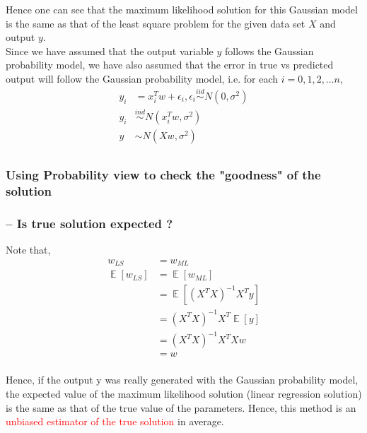 \documentclass{article}
\DeclareMathOperator*{\E}{\mathop{\mathbb{E}}}
\newcommand{\red}[1]{\textcolor{red}{#1}}
\begin{document}
Hence one can see that the maximum likelihood solution for this Gaussian model is the same as that of the least square problem for the given data set $X$ and output $y$.\\
Since we have assumed that the output variable $y$ follows the Gaussian probability model, we have also assumed that the error in true vs predicted output will follow the Gaussian probability model, i.e. for each $i = 0,1,2,\dots n$,
\begin{align*}
    y_i &= x_i^Tw+\epsilon_i, \epsilon_i \stackrel{iid}{\sim} N(0,\sigma^2)\\
    y_i &\stackrel{ind}{\sim} N(x_i^Tw,\sigma^2)\\
    y &\sim N(Xw,\sigma^2)\\
\end{align*}

\subsubsection{Using Probability view to check the "goodness" of the solution}

\subsubsection{-- Is true solution expected ?}

Note that,
\begin{align*}
    w_{LS} &= w_{ML}\\
    \E[w_{LS}] &= \E[w_{ML}]\\
    &= \E[(X^TX)^{-1}X^Ty]\\
    &= (X^TX)^{-1}X^T\E[y]\\
    &= (X^TX)^{-1}X^TXw\\
    &= w\\
\end{align*}

Hence, if the output y was really generated with the Gaussian probability model, the expected value of the maximum likelihood solution (linear regression solution) is the same as that of the true value of the parameters. Hence, this method is an \red{unbiased estimator of the true solution} in average.
\end{document}
